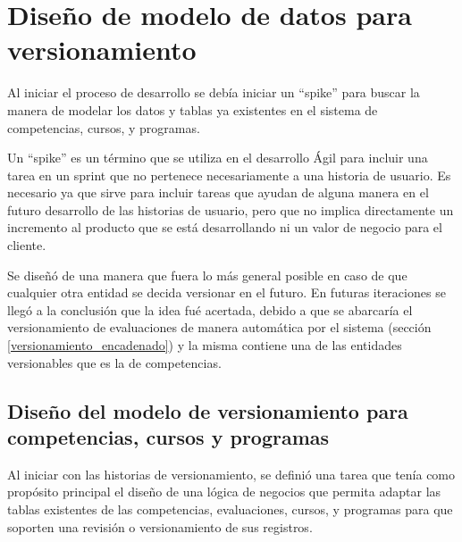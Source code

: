\section{Diseño de modelo de datos para versionamiento}
Al iniciar el proceso de desarrollo se debía iniciar un \enquote{spike} para buscar la manera de modelar los datos y tablas ya existentes en el sistema de competencias, cursos, y programas. 

Un \enquote{spike} es un término que se utiliza en el desarrollo Ágil para incluir una tarea en un sprint que no pertenece necesariamente a una historia de usuario. Es necesario ya que sirve para incluir tareas que ayudan de alguna manera en el futuro desarrollo de las historias de usuario, pero que no implica directamente un incremento al producto que se está desarrollando ni un valor de negocio para el cliente\citep{leffingwell2010agile}.

Se diseñó de una manera que fuera lo más general posible en caso de que cualquier otra entidad se decida versionar en el futuro. En futuras iteraciones se llegó a la conclusión que la idea fué acertada, debido a que se abarcaría el versionamiento de evaluaciones de manera automática por el sistema (sección \ref{versionamiento_encadenado}) y la misma contiene una de las entidades versionables que es la de competencias.

\begin{table}[H]
\centering
{}
\caption{Historias de usuario para el diseño de modelo de datos para versionamiento}
\label{epic:1}
\end{table}


\subsection{Diseño del modelo de versionamiento para competencias, cursos y programas}
Al iniciar con las historias de versionamiento, se definió una tarea que tenía como propósito principal el diseño de una lógica de negocios que permita adaptar las tablas existentes de las competencias, evaluaciones, cursos, y programas para que soporten una revisión o versionamiento de sus registros.

